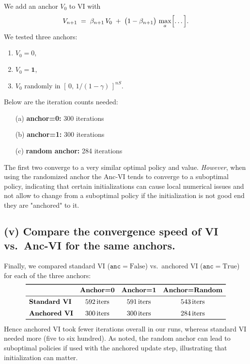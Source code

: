 \noindent
We add an anchor \(V_0\) to VI with
\[
  V_{n+1}
  \;=\;\beta_{n+1}\,V_0 \;+\;\bigl(1-\beta_{n+1}\bigr)\,\max_{a}\Bigl[\dots\Bigr].
\]
We tested three anchors:
\begin{enumerate}[label=(\alph*)]
\item $V_0=0$,
\item $V_0=\mathbf{1}$,
\item $V_0$ randomly in $[\,0,\,1/(1-\gamma)\,]^{nS}$.
\end{enumerate}
Below are the iteration counts needed:
\begin{itemize}
  \item[(a)] \textbf{anchor=0:} 300 iterations
  \item[(b)] \textbf{anchor=1:} 300 iterations
  \item[(c)] \textbf{random anchor:} 284 iterations
\end{itemize}
The first two converge to a very similar optimal policy and value.  
\emph{However}, when using the randomized anchor the Anc-VI tends to converge to a suboptimal policy,
indicating that certain initializations can cause local numerical issues and not allow to change from
a suboptimal policy if the initialization is not good end they are "anchored" to it.

\subsection*{(v) Compare the convergence speed of VI vs.\ Anc-VI for the same anchors.}

\noindent
Finally, we compared standard VI ($\mathtt{anc}=\text{False}$) vs.\ anchored VI ($\mathtt{anc}=\text{True}$) 
for each of the three anchors:
\[
  \begin{array}{lccc}
  \toprule
  & \textbf{Anchor=0} & \textbf{Anchor=1} & \textbf{Anchor=Random} \\
  \midrule
  \textbf{Standard VI} & 592\,\text{iters} & 591\,\text{iters} & 543\,\text{iters} \\[5pt]
  \textbf{Anchored VI} & 300\,\text{iters} & 300\,\text{iters} & 284\,\text{iters} \\
  \bottomrule
  \end{array}
\]
Hence anchored VI took fewer iterations overall in our runs, whereas standard VI needed more 
(five to six hundred).  As noted, the random anchor can lead to suboptimal policies if used 
with the anchored update step, illustrating that initialization can matter.